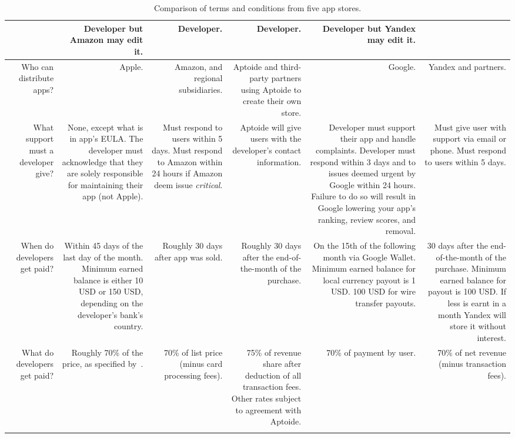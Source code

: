 \documentclass[thesis.tex]{subfiles}
\begin{document}
{{\begin{longtable}{RRRRRR}
 & Developer but Amazon may edit it.
 & Developer.
 & Developer.
 & Developer but Yandex may edit it.
                                              \\\midrule
    Who can distribute apps?
 & Apple.
 & Amazon, and regional subsidiaries.
 & Aptoide and third-party partners using Aptoide to create their own store.
 & Google.
 & Yandex and partners.
                                              \\\midrule
    What support must a developer give?
 & None, except what is in app's EULA.  The developer must acknowledge that they are solely responsible for maintaining their app (not Apple).
 & Must respond to users within 5 days.  Must respond to Amazon within 24 hours if Amazon deem issue \emph{critical}.
 & Aptoide will give users with the developer's contact information.
 & Developer must support their app and handle complaints.  Developer must respond within 3 days and to issues deemed urgent by Google within 24 hours.  Failure to do so will result in Google lowering your app's ranking, review scores, and removal.
 & Must give user with support via email or phone.  Must respond to users within 5 days.
                                              \\\midrule
    When do developers get paid?
 & Within 45 days of the last day of the month.  Minimum earned balance is either 10 USD or 150 USD, depending on the developer's bank's country.
 & Roughly 30 days after app was sold.
 & Roughly 30 days after the end-of-the-month of the purchase.
 & On the 15th of the following month via Google Wallet.  Minimum earned balance for local currency payout is 1 USD. 100 USD for wire transfer payouts.
 & 30 days after the end-of-the-month of the purchase.  Minimum earned balance for payout is 100 USD.  If less is earnt in a month Yandex will store it without interest.
                                              \\\midrule
    What do developers get paid?
 & Roughly 70\% of the price, as specified by~\cite{apple_itunes_2017}.
 & 70\% of list price (minus card processing fees).
 & 75\% of revenue share after deduction of all transaction fees.  Other rates subject to agreement with Aptoide.
 & 70\% of payment by user.
 & 70\% of net revenue (minus transaction fees).
                                              \\
    \bottomrule
    \caption{Comparison of terms and conditions from five app stores.}
    \label{tab:terms-and-conditions}
  \end{longtable}
}}
\end{document}
